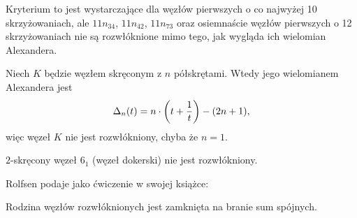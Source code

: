 
Kryterium to jest wystarczające dla węzłów pierwszych o co najwyżej 10 skrzyżowaniach, ale $11n_{34}$, $11n_{42}$, $11n_{73}$ oraz osiemnaście węzłów pierwszych o 12 skrzyżowaniach nie są rozwłóknione mimo tego, jak wygląda ich wielomian Alexandera.

\begin{example}
%
    Niech $K$ będzie węzłem skręconym z $n$ półskrętami.
%
    Wtedy jego wielomianem Alexandera jest
    \begin{equation}
        \Delta_n(t) = n \cdot \left(t + \frac 1 t \right) - (2n+1),
    \end{equation}
    więc węzeł $K$ nie jest rozwłókniony, chyba że $n = 1$.
\end{example}

\begin{corollary}
    $2$-skręcony węzeł $6_1$ (węzeł dokerski) nie jest rozwłókniony.
\end{corollary}

Rolfsen \cite[s. 326]{rolfsen76} podaje jako ćwiczenie w swojej książce:

\begin{proposition}
%
    Rodzina węzłów rozwłóknionych jest zamknięta na branie sum spójnych.
\end{proposition}

%


